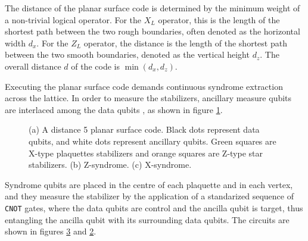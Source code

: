 \documentclass[12pt, twoside, openany]{book}
\begin{document}
The distance of the planar surface code is determined by the minimum weight of a non-trivial logical operator. For the $X_L$ operator, this is the length of the shortest path between the two rough boundaries, often denoted as the horizontal width $d_x$. For the $Z_L$ operator, the distance is the length of the shortest path between the two smooth boundaries, denoted as the vertical height $d_z$. The overall distance $d$ of the code is $\min(d_x, d_z)$. 

Executing the planar surface code demands continuous syndrome extraction across the lattice. In order to measure the stabilizers, ancillary measure qubits are interlaced among the data qubits \cite{Fowler2012}, as shown in figure \ref{fig:ancilla_surface_code}.

\begin{figure}[!ht] 
    \centering
    
    \begin{subfigure}[b]{0.5\textwidth} 
        \centering
        \resizebox{\linewidth}{!}{}
        \caption{}
        \label{fig:ancilla_surface_code}
    \end{subfigure}
    
    \vspace{1em} 
    
    \begin{subfigure}[b]{0.45\textwidth}
        \centering
        \resizebox{\linewidth}{!}{}
        \caption{}
        \label{fig:z-syndrome}
    \end{subfigure}
    \hfill
    \begin{subfigure}[b]{0.45\textwidth}
        \centering
        \resizebox{\linewidth}{!}{}
        \caption{}
        \label{fig:x-syndrome}
    \end{subfigure}
    
    \caption{(a) A distance 5 planar surface code. Black dots represent data qubits, and white dots represent ancillary qubits. Green squares are X-type plaquettes stabilizers and orange squares are Z-type star stabilizers. (b) Z-syndrome. (c) X-syndrome.}
    \label{fig:surface_code_full}
\end{figure}

Syndrome qubits are placed in the centre of each plaquette and in each vertex, and they measure the stabilizer by the application of a standarized sequence of \texttt{CNOT} gates, where the data qubits are control and the ancilla qubit is target, thus entangling the ancilla qubit with its surrounding data qubits. The circuits are shown in figures \ref{fig:x-syndrome} and \ref{fig:z-syndrome}. 
\end{document}
